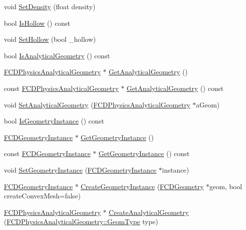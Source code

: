 \begin{DoxyCompactItemize}
\item 
void \hyperlink{classFCDPhysicsShape_a458e68598df3e12b31c549cb83c3b3eb}{SetDensity} (float density)
\item 
bool \hyperlink{classFCDPhysicsShape_ab9d919587c7e5480adfd26450b9600f7}{IsHollow} () const 
\item 
void \hyperlink{classFCDPhysicsShape_a7b85b3f64fbd8c6e6003c598f5ff10f6}{SetHollow} (bool \_\-hollow)
\item 
bool \hyperlink{classFCDPhysicsShape_a648beea84868731c9791be72745b9497}{IsAnalyticalGeometry} () const 
\item 
\hyperlink{classFCDPhysicsAnalyticalGeometry}{FCDPhysicsAnalyticalGeometry} $\ast$ \hyperlink{classFCDPhysicsShape_a1acd950134dce65eace038f4a08ee4b8}{GetAnalyticalGeometry} ()
\item 
const \hyperlink{classFCDPhysicsAnalyticalGeometry}{FCDPhysicsAnalyticalGeometry} $\ast$ \hyperlink{classFCDPhysicsShape_a083c679ad2933f8e467ebec7ffded708}{GetAnalyticalGeometry} () const 
\item 
void \hyperlink{classFCDPhysicsShape_a14e48690f921b0d0c49e813cb62daaa3}{SetAnalyticalGeometry} (\hyperlink{classFCDPhysicsAnalyticalGeometry}{FCDPhysicsAnalyticalGeometry} $\ast$aGeom)
\item 
bool \hyperlink{classFCDPhysicsShape_aee983447f49181dda53f4369c35e1a2d}{IsGeometryInstance} () const 
\item 
\hyperlink{classFCDGeometryInstance}{FCDGeometryInstance} $\ast$ \hyperlink{classFCDPhysicsShape_af98bcdb947593276c55dcd4415a7d5b7}{GetGeometryInstance} ()
\item 
const \hyperlink{classFCDGeometryInstance}{FCDGeometryInstance} $\ast$ \hyperlink{classFCDPhysicsShape_a8b156f2b7257378a16ddf54eb1771f0b}{GetGeometryInstance} () const 
\item 
void \hyperlink{classFCDPhysicsShape_ac3ed3a866d95af407bccd2260531be51}{SetGeometryInstance} (\hyperlink{classFCDGeometryInstance}{FCDGeometryInstance} $\ast$instance)
\item 
\hyperlink{classFCDGeometryInstance}{FCDGeometryInstance} $\ast$ \hyperlink{classFCDPhysicsShape_a7861130d6533bc016531f0cc4c86b215}{CreateGeometryInstance} (\hyperlink{classFCDGeometry}{FCDGeometry} $\ast$geom, bool createConvexMesh=false)
\item 
\hyperlink{classFCDPhysicsAnalyticalGeometry}{FCDPhysicsAnalyticalGeometry} $\ast$ \hyperlink{classFCDPhysicsShape_a0674443390f7c6426171fd4bc21187fb}{CreateAnalyticalGeometry} (\hyperlink{classFCDPhysicsAnalyticalGeometry_a511583406e5c6a1bb5bd84c0453a452c}{FCDPhysicsAnalyticalGeometry::GeomType} type)

\end{DoxyCompactItemize}
